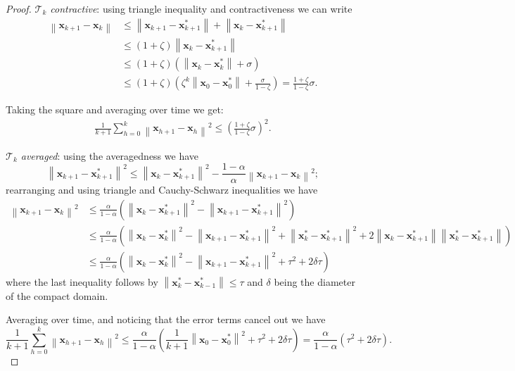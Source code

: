 \documentclass[11pt,a4paper]{article}
\newcommand{\norm}[1]{\left\lVert#1\right\rVert}
\theoremstyle{plain} %
\theoremstyle{definition} %
\theoremstyle{remark} %
\newcommand{\x}{\mathbold{x}}
\newcommand{\T}{\mathcal{T}}
\begin{document}
\begin{proof}
\emph{$\T_k$ contractive}: using triangle inequality and contractiveness we can write
\begin{align*}
	\norm{\x_{k+1} - \x_k} &\leq \norm{\x_{k+1} - \x_{k+1}^*} + \norm{\x_k - \x_{k+1}^*} \\
	&\leq (1 + \zeta) \norm{\x_k - \x_{k+1}^*} \\
	&\leq (1 + \zeta) (\norm{\x_k - \x_k^*} + \sigma) \\
	&\leq (1 + \zeta) \left( \zeta^k \norm{\x_0 - \x_0^*} + \frac{\sigma}{1 - \zeta} \right) = \frac{1 + \zeta}{1 - \zeta} \sigma.
\end{align*}

Taking the square and averaging over time we get:
\begin{align*}
	\frac{1}{k+1} \sum_{h = 0}^k \norm{\x_{h+1} - \x_h}^2 \leq \left( \frac{1 + \zeta}{1 - \zeta} \sigma \right)^2.
\end{align*}

\emph{$\T_k$ averaged}: using the averagedness we have
$$
	\norm{\x_{k+1} - \x_{k+1}^*}^2 \leq \norm{\x_k - \x_{k+1}^*}^2 - \frac{1 - \alpha}{\alpha} \norm{\x_{k+1} - \x_k}^2;
$$
rearranging and using triangle and Cauchy-Schwarz inequalities we have
\begin{align*}
	\norm{\x_{k+1} - \x_k}^2 &\leq \frac{\alpha}{1 - \alpha} \left( \norm{\x_k -\x_{k+1}^*}^2 - \norm{\x_{k+1} - \x_{k+1}^*}^2 \right) \\
	&\leq \frac{\alpha}{1 - \alpha} \left( \norm{\x_k - \x_k^*}^2 - \norm{\x_{k+1} - \x_{k+1}^*}^2 + \norm{\x_k^* - \x_{k+1}^*}^2 + 2 \norm{\x_k - \x_{k+1}^*} \norm{\x_k^* - \x_{k+1}^*} \right) \\
	&\leq \frac{\alpha}{1 - \alpha} \left( \norm{\x_k - \x_k^*}^2 - \norm{\x_{k+1} - \x_{k+1}^*}^2 + \tau^2 + 2 \delta \tau \right)
\end{align*}
where the last inequality follows by $\norm{\x_k^* - \x_{k-1}^*} \leq \tau$ and $\delta$ being the diameter of the compact domain.

Averaging over time, and noticing that the error terms cancel out we have
$$
	\frac{1}{k+1} \sum_{h = 0}^k \norm{\x_{h+1} - \x_h}^2 \leq \frac{\alpha}{1 - \alpha} \left( \frac{1}{k+1} \norm{\x_0 - \x_0^*}^2 + \tau^2 + 2 \delta \tau \right) = \frac{\alpha}{1 - \alpha} (\tau^2 + 2 \delta \tau).
$$
\end{proof}





\end{document}

